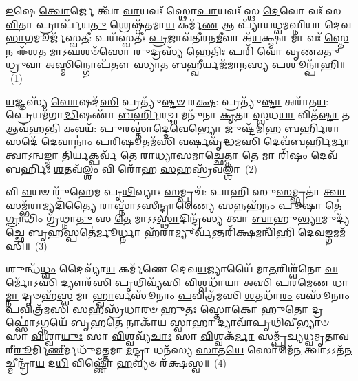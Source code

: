 \setcounter{anuvakam}{0}
\-\ul{𑌇}\-𑌷𑍇 \ul{𑌤𑍍𑌵𑍋}\-𑌰𑍍𑌜𑍇 𑌤𑍍𑌵𑌾᳴ \ul{𑌵𑌾}\-𑌯𑌵𑌃᳴ 𑌸𑍍𑌥𑍋\-\ul{𑌪𑌾}\-𑌯𑌵𑌃᳴ 𑌸𑍍𑌥 \ul{𑌦𑍇}\-𑌵𑍋 𑌵𑌃᳴ 𑌸\-\ul{𑌵𑌿}\-𑌤𑌾 𑌪𑍍𑌰𑌾𑌰𑍍𑌪᳴𑌯\-\ul{𑌤𑍁} 𑌶𑍍𑌰𑍇𑌷𑍍𑌠᳴𑌤𑌮𑌾\-\ul{𑌯} 𑌕𑌰𑍍𑌮᳴\-\ul{𑌣} 𑌆 𑌪𑍍𑌯𑌾᳴𑌯𑌧𑍍𑌵𑌮𑌘𑍍𑌨𑌿𑌯𑌾 𑌦𑍇𑌵\-\ul{𑌭𑌾}\-𑌗𑌮𑍂𑌰𑍍𑌜᳴𑌸𑍍𑌵\-\ul{𑌤𑍀}\-: 𑌪𑌯᳴𑌸𑍍𑌵𑌤𑍀𑌃 \ul{𑌪𑍍𑌰}\-𑌜𑌾𑌵᳴𑌤𑍀𑌰𑌨\-\ul{𑌮𑍀}\-𑌵𑌾 𑌅᳴\-\ul{𑌯}\-𑌕𑍍𑌷𑍍𑌮𑌾 𑌮𑌾 𑌵𑌃᳴ \ul{𑌸𑍍𑌤𑍇}\-𑌨 𑌈᳴𑌶\-\ul{𑌤} 𑌮𑌾\-𑌽𑌘𑌶𑍞᳴𑌸𑍋 \ul{𑌰𑍁}\-𑌦𑍍𑌰𑌸𑍍𑌯᳴ \ul{𑌹𑍇}\-𑌤𑌿𑌃 𑌪𑌰𑌿᳴ 𑌵𑍋 𑌵𑍃𑌣𑌕𑍍𑌤𑍁 \ul{𑌧𑍍𑌰𑍁}\-𑌵𑌾 \ul{𑌅}\-𑌸𑍍𑌮𑌿𑌨𑍍𑌗𑍋𑌪᳴𑌤𑍗 𑌸𑍍𑌯𑌾𑌤 \ul{𑌬}\-𑌹𑍍𑌵𑍀𑌰𑍍𑌯𑌜᳴𑌮𑌾𑌨𑌸𑍍𑌯 \ul{𑌪}\-𑌶𑍂𑌨𑍍𑌪𑌾᳴𑌹𑌿॥~(1)

{\anuvakamend[{\-\ul{𑌇}\-𑌷𑍇 𑌤𑍍𑌰𑌿𑌚᳴𑌤𑍍𑌵𑌾𑌰𑌿𑍞𑌶𑌤𑍍}]}

\-\ul{𑌯}\-𑌜𑍍𑌞𑌸𑍍𑌯᳴ \ul{𑌘𑍋}\-𑌷𑌦᳴\-\ul{𑌸𑌿} 𑌪𑍍𑌰𑌤𑍍𑌯𑍁᳴\-\ul{𑌷𑍍𑌟}\-\-\ul{𑍞} 𑌰\-\ul{𑌕𑍍𑌷}\-: 𑌪𑍍𑌰𑌤𑍍𑌯𑍁᳴\-\ul{𑌷𑍍𑌟𑌾} 𑌅𑌰𑌾᳴𑌤\-\ul{𑌯}\-: 𑌪𑍍𑌰𑍇𑌯𑌮᳴𑌗𑌾\-\ul{𑌦𑍍𑌧𑌿}\-𑌷𑌣𑌾᳴ \ul{𑌬}\-\-\ul{𑌰𑍍}\-𑌹𑌿𑌰\-\ul{𑌚𑍍𑌛} 𑌮𑌨𑍁᳴𑌨𑌾 \ul{𑌕𑍃}\-𑌤𑌾 \ul{𑌸𑍍𑌵}\-𑌧\-\ul{𑌯𑌾} 𑌵𑌿𑌤᳴\-\ul{𑌷𑍍𑌟𑌾} 𑌤 𑌆𑌵᳴𑌹𑌨𑍍𑌤𑌿 \ul{𑌕}\-𑌵𑌯᳴: \ul{𑌪𑍁}\-𑌰𑌸𑍍𑌤𑌾॑\-\ul{𑌦𑍍𑌦𑍇}\-𑌵𑍇\-\ul{𑌭𑍍𑌯𑍋} 𑌜𑍁𑌷𑍍𑌟᳴\-\ul{𑌮𑌿}\-𑌹 \ul{𑌬}\-\-\ul{𑌰𑍍}\-𑌹𑌿\-\ul{𑌰𑌾}\-𑌸𑌦𑍇᳴ \ul{𑌦𑍇}\-𑌵𑌾𑌨𑌾𑌂॑ 𑌪𑌰𑌿\-\ul{𑌷𑍂}\-𑌤𑌮᳴𑌸𑌿 \ul{𑌵}\-\-\ul{𑌰𑍍}\-𑌷𑌵𑍃᳴𑌦𑍍𑌧𑌮\-\ul{𑌸𑌿} 𑌦𑍇𑌵᳴𑌬𑌰𑍍\mbox{}\-\ul{𑌹𑌿}\-𑌰𑍍𑌮𑌾 \ul{𑌤𑍍𑌵𑌾}\-\-𑌽𑌨𑍍𑌵𑌙𑍍𑌮𑌾 \ul{𑌤𑌿}\-𑌰𑍍𑌯𑌕𑍍𑌪𑌰𑍍𑌵᳴ 𑌤𑍇 𑌰𑌾𑌧𑍍𑌯𑌾𑌸𑌮𑌾\-\ul{𑌚𑍍𑌛𑍇}\-𑌤𑍍𑌤𑌾 \ul{𑌤𑍇} 𑌮𑌾 𑌰𑌿᳴\-\ul{𑌷𑌂} 𑌦𑍇𑌵᳴𑌬𑌰𑍍\mbox{}𑌹𑌿𑌃 \ul{𑌶}\-𑌤𑌵᳴𑌲𑍍\mbox{}\-\ul{𑌶𑌂} 𑌵𑌿 𑌰𑍋᳴𑌹 \ul{𑌸}\-𑌹𑌸𑍍𑌰᳴𑌵𑌲𑍍\mbox{}\-\ul{𑌶𑌾}\-~(2)

𑌵𑌿 \ul{𑌵}\-𑌯𑍞 𑌰𑍁᳴𑌹𑍇𑌮 𑌪𑍃\-\ul{𑌥𑌿}\-𑌵𑍍𑌯𑌾𑌃 \ul{𑌸}\-𑌮𑍍𑌪𑍃𑌚᳴: 𑌪𑌾𑌹𑌿 𑌸𑍁\-\ul{𑌸}\-𑌮𑍍𑌭𑍃𑌤𑌾॑ \ul{𑌤𑍍𑌵𑌾} 𑌸𑌮𑍍𑌭᳴\-\ul{𑌰𑌾}\-𑌮𑍍𑌯𑌦𑌿᳴\-\ul{𑌤𑍍𑌯𑍈} 𑌰𑌾𑌸𑍍𑌨𑌾᳴\-𑌽𑌸𑍀\-\ul{𑌨𑍍𑌦𑍍𑌰𑌾}\-𑌣𑍍𑌯𑍈 \ul{𑌸}\-𑌨𑍍𑌨𑌹᳴𑌨𑌂 \ul{𑌪𑍂}\-𑌷𑌾 𑌤𑍇॑ \ul{𑌗𑍍𑌰}\-𑌨𑍍𑌥𑌿𑌂 𑌗𑍍𑌰᳴𑌥𑍍𑌨𑌾\-\ul{𑌤𑍁} 𑌸 \ul{𑌤𑍇} 𑌮𑌾\-𑌽\-𑌽\-\ul{𑌸𑍍𑌥𑌾}\-𑌦𑌿𑌨𑍍𑌦𑍍𑌰᳴𑌸𑍍𑌯 𑌤𑍍𑌵𑌾 \ul{𑌬𑌾}\-𑌹𑍁\-\ul{𑌭𑍍𑌯𑌾}\-𑌮𑍁𑌦𑍍𑌯᳴\-\ul{𑌚𑍍𑌛𑍇} 𑌬𑍃\-\ul{𑌹}\-𑌸𑍍𑌪𑌤𑍇॑\-\ul{𑌰𑍍𑌮𑍂}\-𑌰𑍍𑌧𑍍𑌨𑌾 𑌹᳴𑌰𑌾\-\ul{𑌮𑍍𑌯𑍁}\-𑌰𑍍𑌵᳴𑌨𑍍𑌤𑌰𑌿᳴\-\ul{𑌕𑍍𑌷}\-𑌮𑌨𑍍𑌵𑌿᳴𑌹𑌿 𑌦𑍇𑌵\-\ul{𑌙𑍍𑌗}\-𑌮𑌮᳴𑌸𑌿॥~(3)

{\anuvakamend[{\-\ul{𑌸}\-𑌹𑌸𑍍𑌰᳴𑌵𑌲𑍍\mbox{}𑌶𑌾 \ul{𑌅}\-𑌷𑍍𑌟𑌾𑌤𑍍𑌰𑌿𑍞᳴𑌶𑌚𑍍𑌚}]}

𑌶𑍁𑌨𑍍𑌧᳴\-\ul{𑌧𑍍𑌵𑌂} 𑌦𑍈𑌵𑍍𑌯𑌾᳴\-\ul{𑌯} 𑌕𑌰𑍍𑌮᳴𑌣𑍇 𑌦𑍇𑌵\-\ul{𑌯}\-𑌜𑍍𑌯𑌾𑌯𑍈᳴ 𑌮𑌾\-\ul{𑌤}\-𑌰𑌿𑌶𑍍𑌵᳴𑌨𑍋 \ul{𑌘}\-𑌰𑍍𑌮𑍋᳴\-𑌽\-\ul{𑌸𑌿} 𑌦𑍍𑌯𑍗𑌰᳴𑌸𑌿 𑌪𑍃\-\ul{𑌥𑌿}\-𑌵𑍍𑌯᳴𑌸𑌿 \ul{𑌵𑌿}\-𑌶𑍍𑌵𑌧𑌾᳴𑌯𑌾 𑌅𑌸𑌿 𑌪\-\ul{𑌰}\-𑌮𑍇\-\ul{𑌣} 𑌧𑌾\-\ul{𑌮𑍍𑌨𑌾} 𑌦𑍃𑍞𑌹᳴\-\ul{𑌸𑍍𑌵} 𑌮𑌾 \ul{𑌹𑍍𑌵𑌾}\-𑌰𑍍𑌵𑌸𑍂᳴𑌨𑌾𑌂 \ul{𑌪}\-𑌵𑌿𑌤𑍍𑌰᳴𑌮𑌸𑌿 \ul{𑌶}\-𑌤𑌧𑌾᳴\-\ul{𑌰𑌂} 𑌵𑌸𑍂᳴𑌨𑌾𑌂 \ul{𑌪}\-𑌵𑌿𑌤𑍍𑌰᳴𑌮𑌸𑌿 \ul{𑌸}\-𑌹𑌸𑍍𑌰᳴𑌧𑌾𑌰𑍞 \ul{𑌹𑍁}\-𑌤𑌃 \ul{𑌸𑍍𑌤𑍋}\-𑌕𑍋 \ul{𑌹𑍁}\-𑌤𑍋 \ul{𑌦𑍍𑌰}\-𑌫𑍍𑌸𑍋॑\-𑌽𑌗𑍍𑌨𑌯𑍇᳴ 𑌬𑍃\-\ul{𑌹}\-𑌤𑍇 𑌨𑌾𑌕𑌾᳴\-\ul{𑌯} 𑌸𑍍𑌵𑌾\-\ul{𑌹𑌾} 𑌦𑍍𑌯𑌾𑌵𑌾᳴𑌪𑍃\-\ul{𑌥𑌿}\-𑌵𑍀\-\ul{𑌭𑍍𑌯𑌾}\-\-\ul{𑍞} 𑌸𑌾 \ul{𑌵𑌿}\-𑌶𑍍𑌵𑌾\-\ul{𑌯𑍁𑌃} 𑌸𑌾 \ul{𑌵𑌿}\-𑌶𑍍𑌵𑌵𑍍𑌯᳴\-\ul{𑌚𑌾𑌃} 𑌸𑌾 \ul{𑌵𑌿}\-𑌶𑍍𑌵𑌕᳴\-\ul{𑌰𑍍𑌮𑌾} 𑌸𑌮𑍍𑌪𑍃᳴𑌚𑍍𑌯𑌧𑍍𑌵𑌮𑍃𑌤𑌾𑌵𑌰𑍀\-\ul{𑌰𑍂}\-𑌰𑍍𑌮𑌿\-\ul{𑌣𑍀}\-𑌰𑍍𑌮𑌧𑍁᳴𑌮𑌤𑍍𑌤𑌮𑌾 \ul{𑌮}\-𑌨𑍍𑌦𑍍𑌰𑌾 𑌧𑌨᳴𑌸𑍍𑌯 \ul{𑌸𑌾}\-𑌤\-\ul{𑌯𑍇} 𑌸𑍋𑌮𑍇᳴\-\ul{𑌨} 𑌤𑍍𑌵𑌾\-𑌽\-𑌽𑌤᳴\-\ul{𑌨}\-𑌚𑍍𑌮𑍀𑌨𑍍𑌦𑍍𑌰𑌾᳴\-\ul{𑌯} 𑌦\-\ul{𑌧𑌿} 𑌵𑌿𑌷𑍍𑌣𑍋᳴ \ul{𑌹}\-𑌵𑍍𑌯𑍞 𑌰᳴𑌕𑍍𑌷𑌸𑍍𑌵॥~(4)

